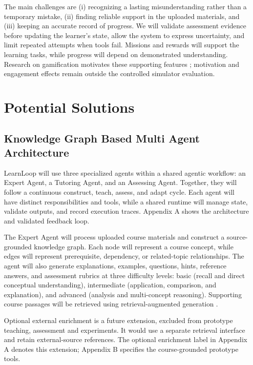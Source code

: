 \documentclass{article}
\begin{document}
The main challenges are (i) recognizing a lasting misunderstanding rather than a temporary mistake, (ii) finding reliable support in the uploaded materials, and (iii) keeping an accurate record of progress. We will validate assessment evidence before updating the learner's state, allow the system to express uncertainty, and limit repeated attempts when tools fail. Missions and rewards will support the learning tasks, while progress will depend on demonstrated understanding. Research on gamification motivates these supporting features \citep{ref3}; motivation and engagement effects remain outside the controlled simulator evaluation.

\section{Potential Solutions}

\subsection{Knowledge Graph Based Multi Agent Architecture}

LearnLoop will use three specialized agents within a shared agentic workflow: an Expert Agent, a Tutoring Agent, and an Assessing Agent. Together, they will follow a continuous construct, teach, assess, and adapt cycle. Each agent will have distinct responsibilities and tools, while a shared runtime will manage state, validate outputs, and record execution traces. Appendix A shows the architecture and validated feedback loop.

The Expert Agent will process uploaded course materials and construct a source-grounded knowledge graph. Each node will represent a course concept, while edges will represent prerequisite, dependency, or related-topic relationships. The agent will also generate explanations, examples, questions, hints, reference answers, and assessment rubrics at three difficulty levels: basic (recall and direct conceptual understanding), intermediate (application, comparison, and explanation), and advanced (analysis and multi-concept reasoning). Supporting course passages will be retrieved using retrieval-augmented generation \citep{ref4}.

Optional external enrichment is a future extension, excluded from prototype teaching, assessment and experiments. It would use a separate retrieval interface and retain external-source references. The optional enrichment label in Appendix A denotes this extension; Appendix B specifies the course-grounded prototype tools.
\end{document}
